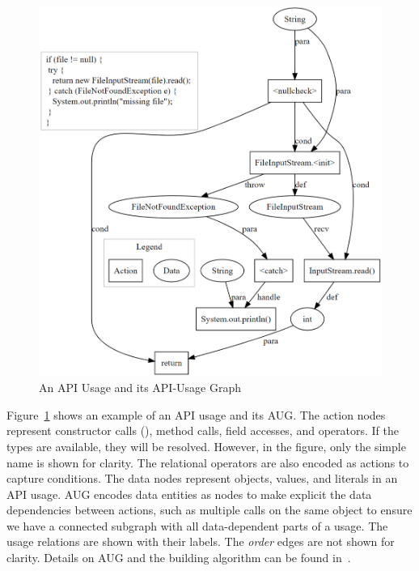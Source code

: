 \begin{figure}[t] %
	\centering
	\includegraphics[width=0.9\linewidth]{aug-example}
        \vspace{-3pt}
	\caption{An API Usage and its API-Usage Graph}
	\label{fig:aug}
\end{figure}

Figure~\ref{fig:aug} shows an example of an API usage and its AUG.
The action nodes represent constructor calls (), method
calls, field accesses, and operators. If the types are available, they
will be resolved. However, in the figure, only the simple name is
shown for clarity. The relational operators are also encoded as
actions to capture conditions. The data nodes represent objects,
values, and literals in an API usage. AUG encodes data entities as
nodes to make explicit the data dependencies between actions, such as
multiple calls on the same object to ensure we have a connected
subgraph with all data-dependent parts of a usage. The usage relations
are shown with their labels. The {\em order} edges are not shown for
clarity. Details on AUG and the building algorithm can be found
in~\cite{msr19}.
